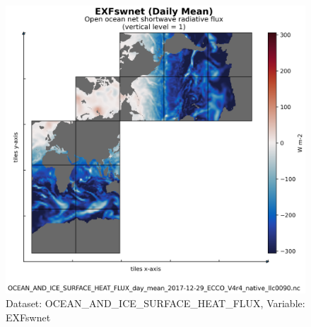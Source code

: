 \begin{figure}[H]
\centering
\includegraphics[scale=0.55]{../images/plots/native_plots/Ocean_and_Sea-Ice_Surface_Heat_Fluxes/EXFswnet.png}
\caption{Dataset: OCEAN\_AND\_ICE\_SURFACE\_HEAT\_FLUX, Variable: EXFswnet}
\label{tab:table-OCEAN_AND_ICE_SURFACE_HEAT_FLUX_EXFswnet-Plot}
\end{figure}
\newpage
\pagebreak
